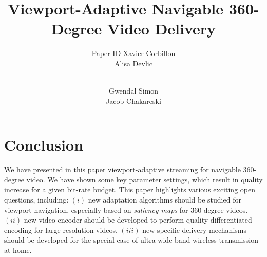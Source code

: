 \documentclass{sig-alternate}
\title{Viewport-Adaptive Navigable 360-Degree Video Delivery}
\author{
\alignauthor
\ifdoubleBlinded
        Paper ID
\else
  Xavier Corbillon\\
  \affaddr{T\'{e}l\'{e}com Bretagne, France}%
\alignauthor
  Alisa Devlic\\
  \affaddr{T\'{e}l\'{e}com Bretagne, France} \\
\and
\alignauthor
  Gwendal Simon\\
  \affaddr{T\'{e}l\'{e}com Bretagne, France}%
\alignauthor
  Jacob Chakareski\\
  \affaddr{Univ. Alabama, USA}
\fi
}
\begin{document}

\maketitle






% 





\section{Conclusion}

We have presented in this paper viewport-adaptive streaming for navigable 360-degree video.
We have shown some key parameter settings, which result in quality increase for a 
given bit-rate budget. This paper highlights various exciting open
questions, including: $(i)$ new adaptation algorithms should be studied for viewport 
navigation, especially based on \emph{saliency maps} for 360-degree videos. $(ii)$ new video encoder 
should be 
developed to perform quality-differentiated encoding for large-resolution videos. $(iii)$ new
specific delivery mechanisms should be developed for the special case of ultra-wide-band 
wireless transmission at home.

%
\end{document}
